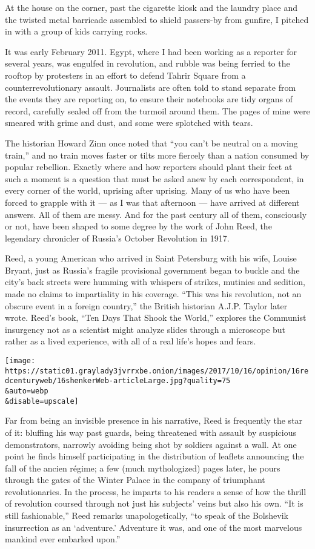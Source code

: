 At the house on the corner, past the cigarette kiosk and the laundry
place and the twisted metal barricade assembled to shield passers-by
from gunfire, I pitched in with a group of kids carrying rocks.

It was early February 2011. Egypt, where I had been working as a
reporter for several years, was engulfed in revolution, and rubble was
being ferried to the rooftop by protesters in an effort to defend Tahrir
Square from a counterrevolutionary assault. Journalists are often told
to stand separate from the events they are reporting on, to ensure their
notebooks are tidy organs of record, carefully sealed off from the
turmoil around them. The pages of mine were smeared with grime and dust,
and some were splotched with tears.

The historian Howard Zinn once noted that ``you can't be neutral on a
moving train,'' and no train moves faster or tilts more fiercely than a
nation consumed by popular rebellion. Exactly where and how reporters
should plant their feet at such a moment is a question that must be
asked anew by each correspondent, in every corner of the world, uprising
after uprising. Many of us who have been forced to grapple with it ---
as I was that afternoon --- have arrived at different answers. All of
them are messy. And for the past century all of them, consciously or
not, have been shaped to some degree by the work of John Reed, the
legendary chronicler of Russia's October Revolution in 1917.

Reed, a young American who arrived in Saint Petersburg with his wife,
Louise Bryant, just as Russia's fragile provisional government began to
buckle and the city's back streets were humming with whispers of
strikes, mutinies and sedition, made no claims to impartiality in his
coverage. ``This was his revolution, not an obscure event in a foreign
country,'' the British historian A.J.P. Taylor later wrote. Reed's book,
``Ten Days That Shook the World,'' explores the Communist insurgency not
as a scientist might analyze slides through a microscope but rather as a
lived experience, with all of a real life's hopes and fears.

\texttt{[image: https://static01.graylady3jvrrxbe.onion/images/2017/10/16/opinion/16redcenturyweb/16shenkerWeb-articleLarge.jpg?quality=75\\\&auto=webp\\\&disable=upscale]}

Far from being an invisible presence in his narrative, Reed is
frequently the star of it: bluffing his way past guards, being
threatened with assault by suspicious demonstrators, narrowly avoiding
being shot by soldiers against a wall. At one point he finds himself
participating in the distribution of leaflets announcing the fall of the
ancien régime; a few (much mythologized) pages later, he pours through
the gates of the Winter Palace in the company of triumphant
revolutionaries. In the process, he imparts to his readers a sense of
how the thrill of revolution coursed through not just his subjects'
veins but also his own. ``It is still fashionable,'' Reed remarks
unapologetically, ``to speak of the Bolshevik insurrection as an
`adventure.' Adventure it was, and one of the most marvelous mankind
ever embarked upon.''

